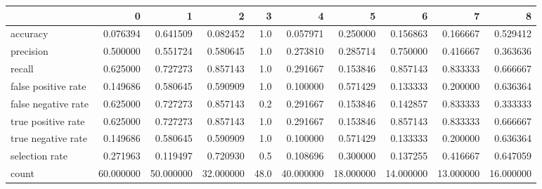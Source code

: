 \begin{tabular}{lrrrrrrrrr}
\toprule
{} &          0 &          1 &          2 &     3 &          4 &          5 &          6 &          7 &          8 \\
\midrule
accuracy            &   0.076394 &   0.641509 &   0.082452 &   1.0 &   0.057971 &   0.250000 &   0.156863 &   0.166667 &   0.529412 \\
precision           &   0.500000 &   0.551724 &   0.580645 &   1.0 &   0.273810 &   0.285714 &   0.750000 &   0.416667 &   0.363636 \\
recall              &   0.625000 &   0.727273 &   0.857143 &   1.0 &   0.291667 &   0.153846 &   0.857143 &   0.833333 &   0.666667 \\
false positive rate &   0.149686 &   0.580645 &   0.590909 &   1.0 &   0.100000 &   0.571429 &   0.133333 &   0.200000 &   0.636364 \\
false negative rate &   0.625000 &   0.727273 &   0.857143 &   0.2 &   0.291667 &   0.153846 &   0.142857 &   0.833333 &   0.333333 \\
true positive rate  &   0.625000 &   0.727273 &   0.857143 &   1.0 &   0.291667 &   0.153846 &   0.857143 &   0.833333 &   0.666667 \\
true negative rate  &   0.149686 &   0.580645 &   0.590909 &   1.0 &   0.100000 &   0.571429 &   0.133333 &   0.200000 &   0.636364 \\
selection rate      &   0.271963 &   0.119497 &   0.720930 &   0.5 &   0.108696 &   0.300000 &   0.137255 &   0.416667 &   0.647059 \\
count               &  60.000000 &  50.000000 &  32.000000 &  48.0 &  40.000000 &  18.000000 &  14.000000 &  13.000000 &  16.000000 \\
\bottomrule
\end{tabular}
